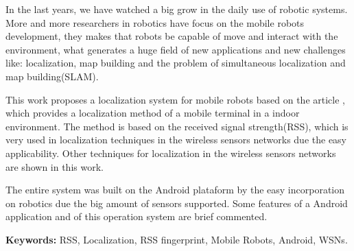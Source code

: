  In the last years, we have watched a big grow in the daily use of robotic systems. 
  More and more researchers in robotics have focus on the mobile robots development, they makes that 
  robots be capable of move and interact with the environment, what generates a huge field of new 
  applications and new challenges like: localization, map building and the problem of simultaneous
  localization and map building(SLAM).

  This work proposes a localization system for mobile robots based on the article \cite{wifiRadar}, 
  which provides a localization method of a mobile terminal in a indoor environment. The method is 
  based on the received signal strength(RSS), which is very used in localization techniques 
  in the wireless sensors networks due the easy applicability. Other techniques for localization 
  in the wireless sensors networks are shown in this work.
  
  The entire system was built on the Android plataform by the easy incorporation on robotics 
  due the big amount of sensors supported. 
  Some features of a Android application and of this operation system are brief commented. 
  
  \textbf{Keywords:} RSS, Localization, RSS fingerprint, Mobile Robots, Android, WSNs.